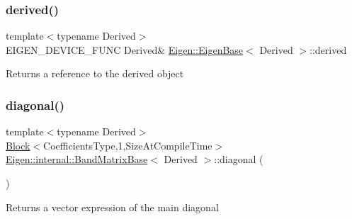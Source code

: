 \subsubsection{\texorpdfstring{derived()}{derived()}\hspace{0.1cm}{\footnotesize\ttfamily [2/2]}}
{\footnotesize\ttfamily template$<$typename Derived$>$ \\
E\+I\+G\+E\+N\+\_\+\+D\+E\+V\+I\+C\+E\+\_\+\+F\+U\+NC Derived\& \mbox{\hyperlink{struct_eigen_1_1_eigen_base}{Eigen\+::\+Eigen\+Base}}$<$ Derived $>$\+::derived\hspace{0.3cm}{\ttfamily [inline]}}

\begin{DoxyReturn}{Returns}
a reference to the derived object 
\end{DoxyReturn}
\mbox{\label{class_eigen_1_1internal_1_1_band_matrix_base_abce1c4d69e72ec594f67a841d1040606}} 
\subsubsection{\texorpdfstring{diagonal()}{diagonal()}\hspace{0.1cm}{\footnotesize\ttfamily [1/6]}}
{\footnotesize\ttfamily template$<$typename Derived$>$ \\
\mbox{\hyperlink{class_eigen_1_1_block}{Block}}$<$Coefficients\+Type,1,Size\+At\+Compile\+Time$>$ \mbox{\hyperlink{class_eigen_1_1internal_1_1_band_matrix_base}{Eigen\+::internal\+::\+Band\+Matrix\+Base}}$<$ Derived $>$\+::diagonal (\begin{DoxyParamCaption}{ }\end{DoxyParamCaption})\hspace{0.3cm}{\ttfamily [inline]}}

\begin{DoxyReturn}{Returns}
a vector expression of the main diagonal 
\end{DoxyReturn}
\mbox{\label{class_eigen_1_1internal_1_1_band_matrix_base_a7c55438da88b00d29f8f514bddfa86ba}} 
